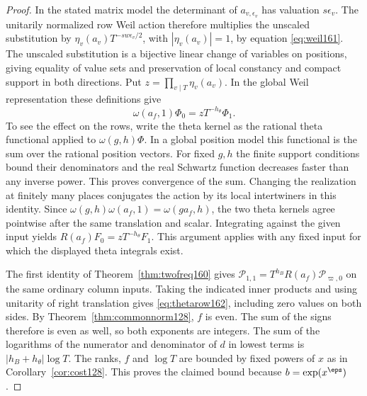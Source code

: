 \documentclass[a4paper,11pt]{article}
\theoremstyle{definition}
\theoremstyle{remark}
\numberwithin{equation}{section}
\begin{document}
\begin{proof}
In the stated matrix model the determinant of \(a_{v,\epsilon_v}\)
has valuation \(s\epsilon_v\). The unitarily normalized row Weil
action therefore multiplies the unscaled substitution by
\(\eta_v(a_v)T^{-sw\epsilon_v/2}\), with \(|\eta_v(a_v)|=1\),
by equation \ref{eq:weil161}.
The unscaled substitution is a bijective linear change of
variables on positions, giving equality of value sets and
preservation of local constancy and compact support in both
directions. Put \(z=\prod_{v\mid T}\eta_v(a_v)\). In the
global Weil representation these definitions give
\[
          \omega(a_f,1)\Phi_0=zT^{-h_\theta}\Phi_1 .
\]
To see the effect on the rows, write the theta kernel as the
rational theta functional applied to \(\omega(g,h)\Phi\).
In a global position model this functional is the sum over the
rational position vectors. For fixed \(g,h\) the finite
support conditions bound their denominators and the real
Schwartz function decreases faster than any inverse power.
This proves convergence of the sum. Changing the realization
at finitely many places conjugates the action by its local
intertwiners in this identity. Since
\(\omega(g,h)\omega(a_f,1)=\omega(g a_f,h)\), the two
theta kernels agree pointwise after the same translation and
scalar. Integrating against the given input yields
\(R(a_f)F_0=zT^{-h_\theta}F_1\). This argument applies with
any fixed input for which the displayed theta integrals exist.

The first identity of Theorem~\ref{thm:twofreq160} gives
\(\mathcal P_{1,1}=T^{h_B}R(a_f)\mathcal P_{\varpi,0}\) on
the same ordinary column inputs. Taking the indicated inner
products and using unitarity of right translation gives
\eqref{eq:thetarow162}, including zero values on both sides.
By Theorem~\ref{thm:commonnorm128}, \(f\) is even. The sum of
the signs therefore is even as well, so both exponents are
integers. The sum of the logarithms of the numerator and
denominator of \(d\) in lowest terms is
\(|h_B+h_\theta|\log T\). The ranks, \(f\) and \(\log T\)
are bounded by fixed powers of \(x\) as in
Corollary~\ref{cor:cost128}. This proves the claimed bound
because \(b=\exp(x^\eps)\).
\end{proof}
\end{document}
